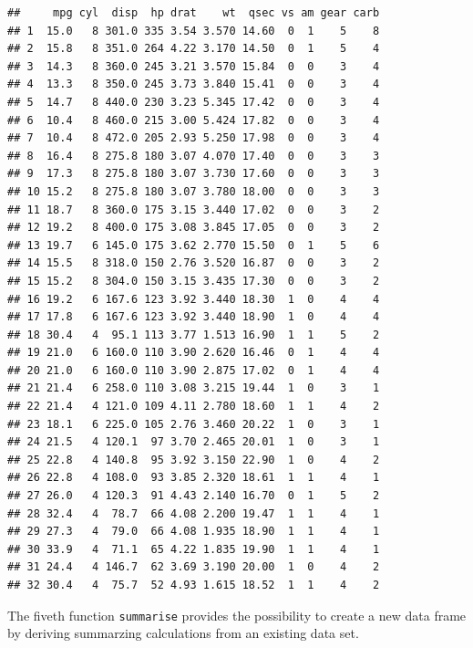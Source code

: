\documentclass[]{report}
\newenvironment{Shaded}{\begin{snugshade}}{\end{snugshade}}
\newcommand{\KeywordTok}[1]{\textcolor[rgb]{0.13,0.29,0.53}{\textbf{#1}}}
\newcommand{\StringTok}[1]{\textcolor[rgb]{0.31,0.60,0.02}{#1}}
\newcommand{\OperatorTok}[1]{\textcolor[rgb]{0.81,0.36,0.00}{\textbf{#1}}}
\newcommand{\NormalTok}[1]{#1}
\begin{document}
\begin{Shaded}
\end{Shaded}

\begin{verbatim}
##     mpg cyl  disp  hp drat    wt  qsec vs am gear carb
## 1  15.0   8 301.0 335 3.54 3.570 14.60  0  1    5    8
## 2  15.8   8 351.0 264 4.22 3.170 14.50  0  1    5    4
## 3  14.3   8 360.0 245 3.21 3.570 15.84  0  0    3    4
## 4  13.3   8 350.0 245 3.73 3.840 15.41  0  0    3    4
## 5  14.7   8 440.0 230 3.23 5.345 17.42  0  0    3    4
## 6  10.4   8 460.0 215 3.00 5.424 17.82  0  0    3    4
## 7  10.4   8 472.0 205 2.93 5.250 17.98  0  0    3    4
## 8  16.4   8 275.8 180 3.07 4.070 17.40  0  0    3    3
## 9  17.3   8 275.8 180 3.07 3.730 17.60  0  0    3    3
## 10 15.2   8 275.8 180 3.07 3.780 18.00  0  0    3    3
## 11 18.7   8 360.0 175 3.15 3.440 17.02  0  0    3    2
## 12 19.2   8 400.0 175 3.08 3.845 17.05  0  0    3    2
## 13 19.7   6 145.0 175 3.62 2.770 15.50  0  1    5    6
## 14 15.5   8 318.0 150 2.76 3.520 16.87  0  0    3    2
## 15 15.2   8 304.0 150 3.15 3.435 17.30  0  0    3    2
## 16 19.2   6 167.6 123 3.92 3.440 18.30  1  0    4    4
## 17 17.8   6 167.6 123 3.92 3.440 18.90  1  0    4    4
## 18 30.4   4  95.1 113 3.77 1.513 16.90  1  1    5    2
## 19 21.0   6 160.0 110 3.90 2.620 16.46  0  1    4    4
## 20 21.0   6 160.0 110 3.90 2.875 17.02  0  1    4    4
## 21 21.4   6 258.0 110 3.08 3.215 19.44  1  0    3    1
## 22 21.4   4 121.0 109 4.11 2.780 18.60  1  1    4    2
## 23 18.1   6 225.0 105 2.76 3.460 20.22  1  0    3    1
## 24 21.5   4 120.1  97 3.70 2.465 20.01  1  0    3    1
## 25 22.8   4 140.8  95 3.92 3.150 22.90  1  0    4    2
## 26 22.8   4 108.0  93 3.85 2.320 18.61  1  1    4    1
## 27 26.0   4 120.3  91 4.43 2.140 16.70  0  1    5    2
## 28 32.4   4  78.7  66 4.08 2.200 19.47  1  1    4    1
## 29 27.3   4  79.0  66 4.08 1.935 18.90  1  1    4    1
## 30 33.9   4  71.1  65 4.22 1.835 19.90  1  1    4    1
## 31 24.4   4 146.7  62 3.69 3.190 20.00  1  0    4    2
## 32 30.4   4  75.7  52 4.93 1.615 18.52  1  1    4    2
\end{verbatim}

The fiveth function \texttt{summarise} provides the possibility to
create a new data frame by deriving summarzing calculations from an
existing data set.
\end{document}

